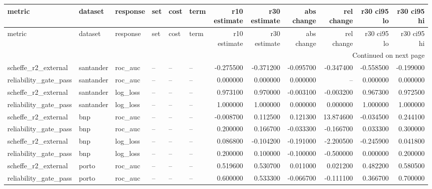 \begin{landscape}
\begin{center}\label{tab:s11}\end{center}
\begingroup\tiny\setlength{\tabcolsep}{2.5pt}
\begin{longtable}{llllllrrrrrr}
\toprule
metric & dataset & response & set & cost & term & r10 estimate & r30 estimate & abs change & rel change & r30 ci95 lo & r30 ci95 hi \\
\midrule
\endfirsthead
\toprule
metric & dataset & response & set & cost & term & r10 estimate & r30 estimate & abs change & rel change & r30 ci95 lo & r30 ci95 hi \\
\midrule
\endhead
\midrule
\multicolumn{12}{r}{Continued on next page} \\
\midrule
\endfoot
\bottomrule
\endlastfoot
scheffe\_r2\_external & santander & roc\_auc & -- & -- & -- & -0.275500 & -0.371200 & -0.095700 & -0.347400 & -0.558500 & -0.199000 \\
reliability\_gate\_pass & santander & roc\_auc & -- & -- & -- & 0.000000 & 0.000000 & 0.000000 & -- & 0.000000 & 0.000000 \\
scheffe\_r2\_external & santander & log\_loss & -- & -- & -- & 0.973100 & 0.970000 & -0.003100 & -0.003200 & 0.967300 & 0.972500 \\
reliability\_gate\_pass & santander & log\_loss & -- & -- & -- & 1.000000 & 1.000000 & 0.000000 & 0.000000 & 1.000000 & 1.000000 \\
scheffe\_r2\_external & bnp & roc\_auc & -- & -- & -- & -0.008700 & 0.112500 & 0.121300 & 13.874600 & -0.034500 & 0.244100 \\
reliability\_gate\_pass & bnp & roc\_auc & -- & -- & -- & 0.200000 & 0.166700 & -0.033300 & -0.166700 & 0.033300 & 0.300000 \\
scheffe\_r2\_external & bnp & log\_loss & -- & -- & -- & 0.086800 & -0.104200 & -0.191000 & -2.200500 & -0.245900 & 0.041800 \\
reliability\_gate\_pass & bnp & log\_loss & -- & -- & -- & 0.200000 & 0.100000 & -0.100000 & -0.500000 & 0.000000 & 0.200000 \\
scheffe\_r2\_external & porto & roc\_auc & -- & -- & -- & 0.519600 & 0.530700 & 0.011000 & 0.021200 & 0.482200 & 0.580500 \\
reliability\_gate\_pass & porto & roc\_auc & -- & -- & -- & 0.600000 & 0.533300 & -0.066700 & -0.111100 & 0.366700 & 0.700000 \\

\end{longtable}
\end{landscape}
